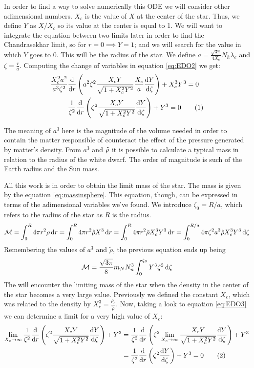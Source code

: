 \documentclass[a4paper]{article}
\newcommand\numberthis{\addtocounter{equation}{1}\tag{\theequation}}
\newcommand\M{\mathcal{M}}
\begin{document}
In order to find a way to solve numerically this ODE we will consider other adimensional numbers. $X_c$ is the value of $X$ at the center of the star. Thus, we define $Y$ as $X/X_c$ so its value at the center is equal to 1. We will want to integrate the equation between two limits later in order to find the Chandrasekhar limit, so for $r=0\implies Y=1$; and we will search for the value in which $Y$ goes to 0. This will be the radius of the star. We define $a=\frac{\sqrt{3\pi}}{4X_c}N_h\lambda_e$ and $\zeta=\frac{r}{a}$. Computing the change of variables in equation \eqref{eq:EDO2} we get:
\begin{align*}\label{eq:EDO3}
    \frac{X_c^2a^2}{a^3\zeta^2}&\odv*{\left(a^2\zeta^2\frac{X_cY}{\sqrt{1+X_c^2Y^2}}\frac{X_c}{a}\odv{Y}{\zeta}\right)}{r}+X_c^3Y^3=0\\
    &\frac{1}{\zeta^2}\odv*{\left( \zeta^2\frac{X_cY}{\sqrt{1+X_c^2Y^2}}\odv{Y}{\zeta}\right)}{r}+Y^3=0\numberthis
\end{align*}

The meaning of $a^3$ here is the magnitude of the volume needed in order to contain the matter responsible of counteract the effect of the pressure generated by matter's density. From $a^3$ and $\Tilde{\rho}$ it is possible to calculate a typical mass in relation to the radius of the white dwarf. The order of magnitude is such of the Earth radius and the Sun mass.

All this work is in order to obtain the limit mass of the star. The mass is given by the equation \eqref{eq:massinsphere}. This equation, though, can be expressed in terms of the adimensional variables we've found. We introduce $\zeta_0=R/a$, which refers to the radius of the star as $R$ is the radius.    
\begin{align*}
    \M=\int_{0}^{R}4\pi r^2\rho \odif{r}=\int_{0}^{R}4\pi r^2\Tilde{\rho}X^3 \odif{r}
    =\int_{0}^{R}4\pi r^2\Tilde{\rho}X_c^3Y^3\odif{r}=\int_{0}^{R/a}4\pi\zeta^2a^3\Tilde{\rho}X_c^3Y^3\odif{\zeta}
\end{align*}
Remembering the values of $a^3$ and $\tilde{\rho}$, the previous equation ends up being
\begin{equation}
    \M=\frac{\sqrt{3\pi}}{8}m_NN_n^3\int_{0}^{\zeta_0}Y^3\zeta^2 \odif{\zeta}
    \label{eq:massa}
\end{equation}
The will encounter the limiting mass of the star when the density in the center of the star becomes a very large value. Previously we defined the constant $X_c$, which was related to the density by $X_c^3=\frac{\rho_c}{\tilde{\rho}}$. Now, taking a look to equation \eqref{eq:EDO3} we can determine a limit for a very high value of $X_c$:
\begin{align*}\label{eq:aberracio}
    \lim_{X_c\to\infty}\frac{1}{\zeta^2}\odv*{\left( \zeta^2\frac{X_cY}{\sqrt{1+X_c^2Y^2}}\odv{Y}{\zeta}\right)}{r}+Y^3&=\frac{1}{\zeta^2}\odv*{\left( \zeta^2\lim_{X_c\to\infty}\frac{X_cY}{\sqrt{1+X_c^2Y^2}}\odv{Y}{\zeta}\right)}{r}+Y^3\\
    &=\frac{1}{\zeta^2}\odv*{\left( \zeta^2\odv{Y}{\zeta}\right)}{r}+Y^3=0\numberthis
\end{align*}
\end{document}
